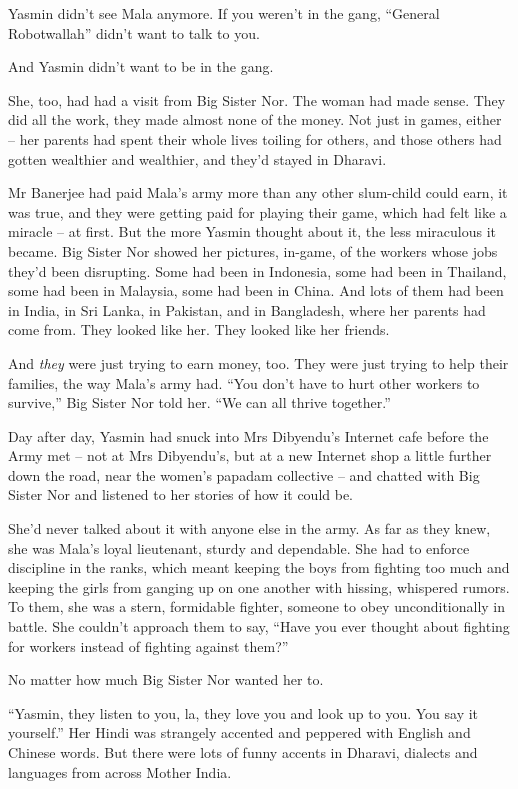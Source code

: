 Yasmin didn't see Mala anymore. If you weren't in the gang,
``General Robotwallah'' didn't want to talk to you.

And Yasmin didn't want to be in the gang.

She, too, had had a visit from Big Sister Nor. The woman had made
sense. They did all the work, they made almost none of the money.
Not just in games, either -- her parents had spent their whole
lives toiling for others, and those others had gotten wealthier and
wealthier, and they'd stayed in Dharavi.

Mr Banerjee had paid Mala's army more than any other slum-child
could earn, it was true, and they were getting paid for playing
their game, which had felt like a miracle -- at first. But the more
Yasmin thought about it, the less miraculous it became. Big Sister
Nor showed her pictures, in-game, of the workers whose jobs they'd
been disrupting. Some had been in Indonesia, some had been in
Thailand, some had been in Malaysia, some had been in China. And
lots of them had been in India, in Sri Lanka, in Pakistan, and in
Bangladesh, where her parents had come from. They looked like her.
They looked like her friends.

And \emph{they} were just trying to earn money, too. They were just
trying to help their families, the way Mala's army had. ``You don't
have to hurt other workers to survive,'' Big Sister Nor told her.
``We can all thrive together.''

Day after day, Yasmin had snuck into Mrs Dibyendu's Internet cafe
before the Army met -- not at Mrs Dibyendu's, but at a new Internet
shop a little further down the road, near the women's papadam
collective -- and chatted with Big Sister Nor and listened to her
stories of how it could be.

She'd never talked about it with anyone else in the army. As far as
they knew, she was Mala's loyal lieutenant, sturdy and dependable.
She had to enforce discipline in the ranks, which meant keeping the
boys from fighting too much and keeping the girls from ganging up
on one another with hissing, whispered rumors. To them, she was a
stern, formidable fighter, someone to obey unconditionally in
battle. She couldn't approach them to say, ``Have you ever thought
about fighting for workers instead of fighting against them?''

No matter how much Big Sister Nor wanted her to.

``Yasmin, they listen to you, la, they love you and look up to you.
You say it yourself.'' Her Hindi was strangely accented and peppered
with English and Chinese words. But there were lots of funny
accents in Dharavi, dialects and languages from across Mother
India.

